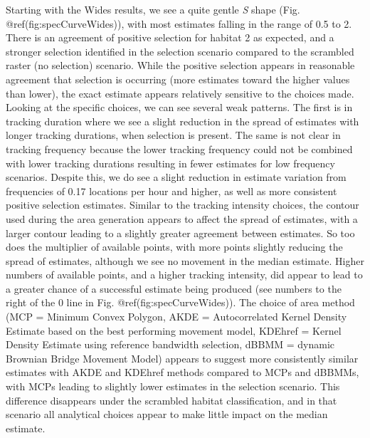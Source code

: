 \documentclass[10pt,a4paper]{article}
\begin{document}
Starting with the Wides results, we see a quite gentle \emph{S} shape (Fig. @ref(fig:specCurveWides)), with most estimates falling in the range of 0.5 to 2.
There is an agreement of positive selection for habitat 2 as expected, and a stronger selection identified in the selection scenario compared to the scrambled raster (no selection) scenario.
While the positive selection appears in reasonable agreement that selection is occurring (more estimates toward the higher values than lower), the exact estimate appears relatively sensitive to the choices made.
Looking at the specific choices, we can see several weak patterns.
The first is in tracking duration where we see a slight reduction in the spread of estimates with longer tracking durations, when selection is present.
The same is not clear in tracking frequency because the lower tracking frequency could not be combined with lower tracking durations resulting in fewer estimates for low frequency scenarios.
Despite this, we do see a slight reduction in estimate variation from frequencies of 0.17 locations per hour and higher, as well as more consistent positive selection estimates.
Similar to the tracking intensity choices, the contour used during the area generation appears to affect the spread of estimates, with a larger contour leading to a slightly greater agreement between estimates.
So too does the multiplier of available points, with more points slightly reducing the spread of estimates, although we see no movement in the median estimate.
Higher numbers of available points, and a higher tracking intensity, did appear to lead to a greater chance of a successful estimate being produced (see numbers to the right of the 0 line in Fig. @ref(fig:specCurveWides)).
The choice of area method (MCP = Minimum Convex Polygon, AKDE = Autocorrelated Kernel Density Estimate based on the best performing movement model, KDEhref = Kernel Density Estimate using reference bandwidth selection, dBBMM = dynamic Brownian Bridge Movement Model) appears to suggest more consistently similar estimates with AKDE and KDEhref methods compared to MCPs and dBBMMs, with MCPs leading to slightly lower estimates in the selection scenario.
This difference disappears under the scrambled habitat classification, and in that scenario all analytical choices appear to make little impact on the median estimate.
\end{document}
